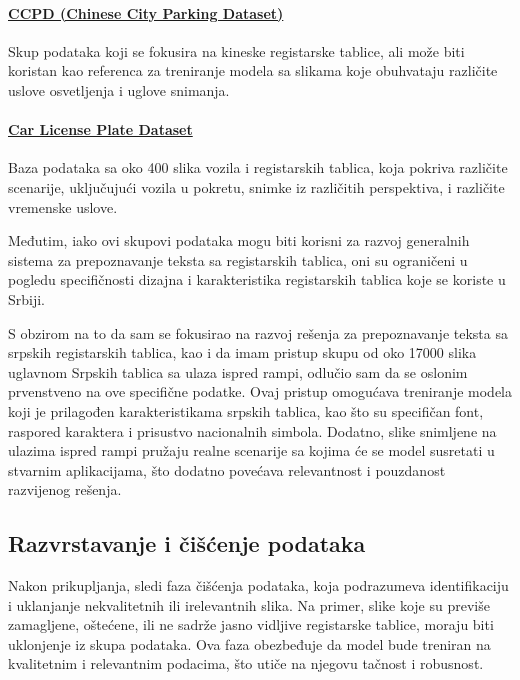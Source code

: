 \documentclass[a4paper,12pt]{article}
\begin{document}
	\paragraph{\href{https://github.com/detectRecog/CCPD}{CCPD (Chinese City Parking Dataset)}}
	Skup podataka koji se fokusira na kineske registarske tablice, ali može biti koristan kao referenca za treniranje modela sa slikama koje obuhvataju različite uslove osvetljenja i uglove snimanja.
	
	\paragraph{\href{https://datasetninja.com/car-license-plate}{Car License Plate Dataset}}
	Baza podataka sa oko 400 slika vozila i registarskih tablica, koja pokriva različite scenarije, uključujući vozila u pokretu, snimke iz različitih perspektiva, i različite vremenske uslove. \newline
	
	Međutim, iako ovi skupovi podataka mogu biti korisni za razvoj generalnih sistema za prepoznavanje teksta sa registarskih tablica, oni su ograničeni u pogledu specifičnosti dizajna i karakteristika registarskih tablica koje se koriste u Srbiji.
	
	S obzirom na to da sam se fokusirao na razvoj rešenja za prepoznavanje teksta sa srpskih registarskih tablica, kao i da imam pristup skupu od oko 17000 slika uglavnom Srpskih tablica sa ulaza ispred rampi, odlučio sam da se oslonim prvenstveno na ove specifične podatke. Ovaj pristup omogućava treniranje modela koji je prilagođen karakteristikama srpskih tablica, kao što su specifičan font, raspored karaktera i prisustvo nacionalnih simbola. Dodatno, slike snimljene na ulazima ispred rampi pružaju realne scenarije sa kojima će se model susretati u stvarnim aplikacijama, što dodatno povećava relevantnost i pouzdanost razvijenog rešenja.
	
	\subsection{Razvrstavanje i čišćenje podataka}
	Nakon prikupljanja, sledi faza čišćenja podataka, koja podrazumeva identifikaciju i uklanjanje nekvalitetnih ili irelevantnih slika. Na primer, slike koje su previše zamagljene, oštećene, ili ne sadrže jasno vidljive registarske tablice, moraju biti uklonjenje iz skupa podataka. Ova faza obezbeđuje da model bude treniran na kvalitetnim i relevantnim podacima, što utiče na njegovu tačnost i robusnost.
	
\end{document}
